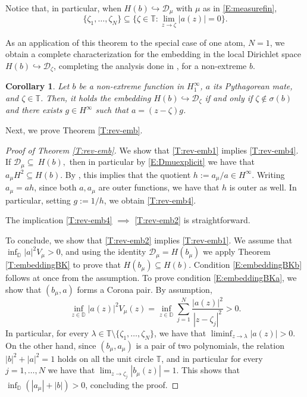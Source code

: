 \documentclass[12pt]{amsart}
\newtheorem{corollary}[theorem]{Corollary}
\theoremstyle{definition}
\theoremstyle{remark}
\theoremstyle{remark}
\begin{document}
Notice that, in particular, when $H(b)\hookrightarrow\mathcal{D}_\mu$ with $\mu$ as in \eqref{E:measurefin},
\[\{\zeta_1,\ldots,\zeta_N\}\subseteq\{\zeta\in\mathbb{T}\colon \lim_{z\to\zeta}|a(z)|=0\}.\]

As an application of this theorem to the special case of one atom, $N=1$, we obtain a complete characterization for the embedding in the local Dirichlet space $H(b) \hookrightarrow \mathcal{D}_\zeta$, completing the analysis done in \cite{bellavita2023embedding}, for a non-extreme $b$.

\begin{corollary}
    Let $b$ be a non-extreme function in $H^\infty_1$, $a$ its Pythagorean mate, and $\zeta\in\mathbb{T}$. Then, it holds the embedding $H(b)\hookrightarrow\mathcal{D}_\zeta$ if and only if  $\zeta\notin\sigma(b)$ and there exists $g\in H^\infty$ such that $a=(z-\zeta)g$. 
\end{corollary}

Next, we prove Theorem \ref{T:rev-emb}.

 \begin{proof}[Proof of Theorem \ref{T:rev-emb}]
     We show that \ref{T:rev-emb1} implies \ref{T:rev-emb4}. If $\mathcal{D}_\mu \subseteq \ H(b),$ then in particular by \eqref{E:Dmuexplicit} we have that $a_\mu H^2\subseteq H(b)$. By \cite[Theorem 23.6]{hb2}, this implies that the quotient $h:=a_\mu/a\in H^\infty$. Writing $a_\mu=ah$, since both $a,a_\mu$ are outer functions, we have that $h$ is outer as well. In particular, setting $g:= 1/h$, we obtain \ref{T:rev-emb4}. 

      The implication \ref{T:rev-emb4} $\implies$ \ref{T:rev-emb2} is straightforward. 
      
      To conclude, we show that \ref{T:rev-emb2} implies \ref{T:rev-emb1}. We assume that $\inf_{\mathbb{D}} |a|^2 V_\mu >0$, and using the identity $\mathcal{D}_\mu=H(b_\mu)$ we apply Theorem \ref{T:embeddingBK} to prove that $H(b_\mu)\subseteq H(b).$ Condition \ref{E:embeddingBKb} follows at once from the assumption. To prove condition \ref{E:embeddingBKa}, we show that $(b_\mu,a)$ forms a Corona pair. By assumption,
      \[\inf_{z\in\mathbb{D}} |a(z)|^2V_\mu(z) =\inf_{z\in\mathbb{D}}\sum_{j=1}^N \frac{|a(z)|^2}{|z-\zeta_j|^2}>0.\]
      In particular, for every $\lambda\in\mathbb{T}\setminus\{\zeta_1,\ldots,\zeta_N\}$, we have that $\liminf_{z\to\lambda}|a(z)|>0.$ On the other hand, since $(b_\mu,a_\mu)$ is a pair of two polynomials, the relation $|b|^2+|a|^2=1$ holds on all the unit circle $\mathbb{T}$, and in particular for every $j=1,\ldots,N$ we have that $\lim_{z\to\zeta_j} |b_\mu(z)|=1.$ This shows that $\inf_{\mathbb{D}}(|a_\mu|+|b|)>0$, concluding the proof.
 \end{proof}
\end{document}
